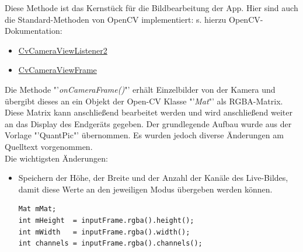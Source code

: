 \begin{description}
Diese Methode ist das Kernstück für die Bildbearbeitung der App. 
Hier sind auch die Standard-Methoden von OpenCV implementiert:
s. hierzu OpenCV-Dokumentation:
\begin{itemize}
\item \href{http://docs.opencv.org/java/2.4.9/org/opencv/android/CameraBridgeViewBase.CvCameraViewListener2.html}{CvCameraViewListener2}
\item \href{http://docs.opencv.org/java/2.4.9/org/opencv/android/CameraBridgeViewBase.CvCameraViewFrame.html}{CvCameraViewFrame}
\end{itemize}
 Die Methode "'\textit{onCameraFrame()}"' erhält Einzelbilder von der Kamera und übergibt dieses an ein Objekt der Open-CV Klasse "'\textit{Mat}"' als RGBA-Matrix. Diese Matrix kann anschließend bearbeitet werden und wird anschließend weiter an das Display des Endgeräts gegeben. Der grundlegende Aufbau wurde aus der Vorlage "'QuantPic"' übernommen. Es wurden jedoch diverse Änderungen am Quelltext vorgenommen.\\ 
Die wichtigsten Änderungen:
\begin{itemize}
\item Speichern der Höhe, der Breite und der Anzahl der Kanäle des Live-Bildes, damit diese Werte an den jeweiligen Modus übergeben werden können.
\begin{lstlisting}
Mat mMat;
int mHeight  = inputFrame.rgba().height();
int mWidth   = inputFrame.rgba().width();
int channels = inputFrame.rgba().channels();
\end{lstlisting}


\end{itemize}
\end{description}
